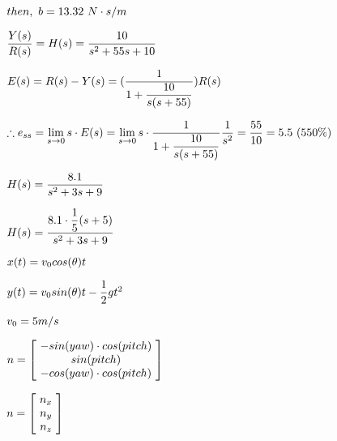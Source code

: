 \documentclass[draft, pdftex, a4paper, 12pt, openbib, ]{article}
\begin{document}
$  then, \ b = 13.32 \ N\cdot s/m     \\$




$   \dfrac{Y(s)}{R(s)} = H(s) = \dfrac{10}{s^{2} + 55s + 10}   \\\\$


$    E(s) = R(s) - Y(s) =  (\dfrac{1}{1+\dfrac{10}{s(s+55)}})R(s)   \\\\$



$   \therefore e_{ss} = \lim\limits_{s \rightarrow 0} s\cdot E(s) = \lim\limits_{s \rightarrow 0} s\cdot \dfrac{1}{1+\dfrac{10}{s(s+55)}} \dfrac{1}{s^2} = \dfrac{55}{10}  = 5.5 \ (550 \%)\\\\$



$  H(s) = \dfrac{8.1}{s^2 + 3s + 9}     \\\\$


$  H(s) = \dfrac{8.1 \cdot \dfrac{1}{5}(s+5)}{s^2 + 3s + 9}     \\\\\\\\\\$


$     x(t) = v_{0} cos(\theta) t  \\\\$


$   y(t) = v_{0} sin(\theta)  t - \dfrac{1}{2}gt^2    \\\\$


$     v_{0} = 5 m/s  \\\\$


$     n = \begin{bmatrix}
\ -sin(yaw)\cdot cos(pitch) \ \\  
\ sin(pitch) \ \\ 
\ -cos(yaw)\cdot cos(pitch) \ 
\end{bmatrix}  \\\\$


$    n = \begin{bmatrix}
\ n_{x} \ \\  
\ n_{y} \ \\ 
\ n_{z} \
\end{bmatrix}   \\\\$
\end{document}
